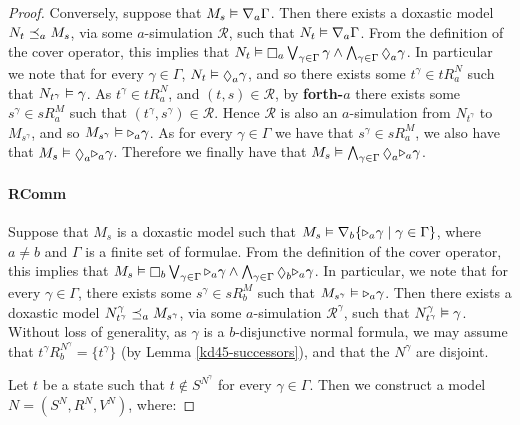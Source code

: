 \begin{proof}
Conversely, suppose that $M_s \vDash \nabla_a \Gamma$. Then there exists a
doxastic model $N_t \preceq_a M_s$, via some $a$-simulation $\mathcal{R}$,
such that $N_t \vDash \nabla_a \Gamma$. From the definition of the cover
operator, this implies that $N_t \entails \knows_a \bigvee_{\gamma \in \Gamma}
\gamma \land \bigwedge_{\gamma \in \Gamma} \suspects_a \gamma$. In particular we
note that for every $\gamma \in \Gamma$, $N_t \entails \suspects_a \gamma$, and
so there exists some $t^\gamma \in tR^N_a$ such that $N_{t^\gamma} \vDash
\gamma$. As $t^\gamma \in tR^N_a$, and $(t, s) \in \mathcal{R}$, by {\bf
forth-$a$} there exists some $s^\gamma \in sR^M_a$ such that $(t^\gamma, s^\gamma)
\in \mathcal{R}$. Hence $\mathcal{R}$ is also an $a$-simulation from
$N_{t^\gamma}$ to $M_{s^\gamma}$, and so $M_{s^\gamma} \vDash {\ensuremath{\mathopen{\triangleright}}}_a
\gamma$. As for every $\gamma \in \Gamma$ we have that $s^\gamma \in sR^M_a$, we
also have that $M_s \entails \suspects_a \somerefs_a \gamma$. Therefore we
finally have that $M_s \entails \bigwedge_{\gamma \in \Gamma} \suspects_a
\somerefs_a \gamma$.

\paragraph{RComm} Suppose that $M_s$ is a doxastic model such that $M_s
\vDash \nabla_b \{ {\mathopen{\triangleright}}_a \gamma \mid \gamma \in \Gamma\}$, where $a \ne
b$ and $\Gamma$ is a finite set of formulae. From the definition of the cover
operator, this implies that $M_s \entails \knows_b \bigvee_{\gamma \in \Gamma}
\somerefs_a \gamma \land \bigwedge_{\gamma \in \Gamma} \suspects_b \somerefs_a
\gamma$. In particular, we note that for every $\gamma \in \Gamma$, there exists
some $s^\gamma \in sR^M_b$ such that $M_{s^\gamma} \vDash {\ensuremath{\mathopen{\triangleright}}}_a \gamma$.
Then there exists a doxastic model $N^\gamma_{t^\gamma} \preceq_a
M_{s^\gamma}$, via some $a$-simulation $\mathcal{R}^\gamma$, such that
$N^\gamma_{t^\gamma} \vDash \gamma$. Without loss of generality, as $\gamma$
is a $b$-disjunctive normal formula, we may assume that $t^\gamma R^{N^\gamma}_b
= \{t^\gamma\}$ (by Lemma \ref{kd45-successors}), and that the $N^\gamma$ are
disjoint.

Let $t$ be a state such that $t \notin S^{N^\gamma}$ for every $\gamma \in
\Gamma$. Then we construct a model $N = (S^N, R^N, V^N)$, where:


\end{proof}
